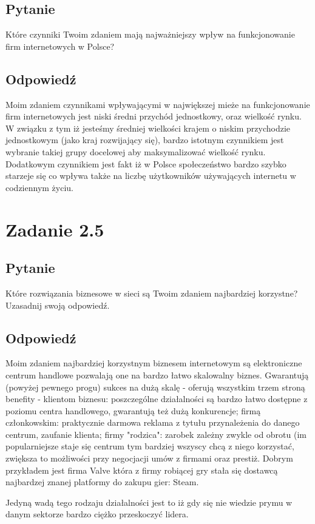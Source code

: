 \documentclass[paper=a4, fontsize=11pt]{scrartcl} %
\numberwithin{equation}{section} %
\numberwithin{figure}{section} %
\numberwithin{table}{section} %
\begin{document}
\subsection {Pytanie}

Które czynniki Twoim zdaniem mają najważniejszy wpływ na funkcjonowanie firm internetowych w Polsce?

\subsection  {Odpowiedź}

Moim zdaniem czynnikami wpływającymi w największej mieże na funkcjonowanie firm internetowych jest niski średni przychód jednostkowy,
oraz wielkość rynku. W związku z tym iż jesteśmy średniej wielkości krajem o niskim przychodzie jednostkowym (jako kraj rozwijający się),
bardzo istotnym czynnikiem jest wybranie takiej grupy docelowej aby maksymalizować wielkość rynku. Dodatkowym czynnikiem jest fakt iż w Polsce
społeczeństwo bardzo szybko starzeje się co wpływa także na liczbę użytkowników używających internetu w codziennym życiu.

\section{Zadanie 2.5}

\subsection {Pytanie}

Które rozwiązania biznesowe w sieci są Twoim zdaniem najbardziej korzystne? Uzasadnij swoją odpowiedź.

\subsection  {Odpowiedź}

Moim zdaniem najbardziej korzystnym biznesem internetowym są elektroniczne centrum handlowe pozwalają one na bardzo łatwo skalowalny biznes.
Gwarantują (powyżej pewnego progu) sukces na dużą skalę - oferują wszystkim trzem stroną benefity - klientom biznesu: poszczególne działalności są
bardzo łatwo dostępne z poziomu centra handlowego, gwarantują też dużą konkurencje; firmą członkowskim: praktycznie darmowa reklama z tytułu przynależenia
do danego centrum, zaufanie klienta; firmy "rodzica": zarobek zależny zwykle od obrotu (im popularniejsze staje się centrum tym bardziej wszyscy chcą z niego korzystać,
zwiększa to możliwości przy negocjacji umów z firmami oraz prestiż. Dobrym przykładem jest firma Valve która z firmy robiącej gry stała się dostawcą najbardzej
znanej platformy do zakupu gier: Steam. 

Jedyną wadą tego rodzaju działalności jest to iż gdy się nie wiedzie prymu w danym sektorze bardzo ciężko przeskoczyć lidera.
\end{document}
